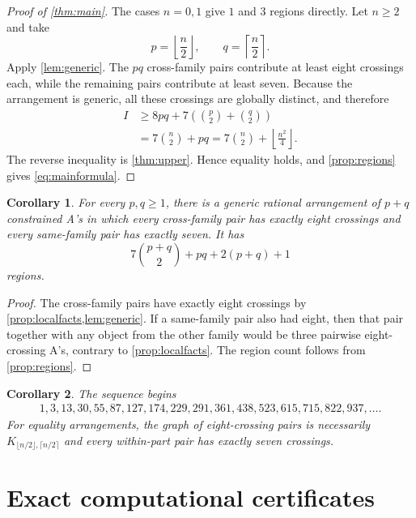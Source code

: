 \documentclass[11pt]{amsart}
\newtheorem{corollary}[corollary]{Corollary}
\theoremstyle{definition}
\begin{document}
\begin{proof}[Proof of \cref{thm:main}]
The cases $n=0,1$ give $1$ and $3$ regions directly.  Let $n\ge2$ and take
\[
 p=\left\lfloor\frac n2\right\rfloor,
 \qquad
 q=\left\lceil\frac n2\right\rceil.
\]
Apply \cref{lem:generic}.  The $pq$ cross-family pairs contribute at least
eight crossings each, while the remaining pairs contribute at least seven.
Because the arrangement is generic, all these crossings are globally
distinct, and therefore
\begin{align*}
 I
 &\ge 8pq+7\left(\binom p2+\binom q2\right)\\
 &=7\binom n2+pq
 =7\binom n2+\left\lfloor\frac{n^2}{4}\right\rfloor.
\end{align*}
The reverse inequality is \cref{thm:upper}.  Hence equality holds, and
\cref{prop:regions} gives \eqref{eq:mainformula}.
\end{proof}

\begin{corollary}\label{cor:arbitraryparts}
For every $p,q\ge1$, there is a generic rational arrangement of $p+q$
constrained A's in which every cross-family pair has exactly eight crossings
and every same-family pair has exactly seven.  It has
\[
 7\binom{p+q}{2}+pq+2(p+q)+1
\]
regions.
\end{corollary}

\begin{proof}
The cross-family pairs have exactly eight crossings by
\cref{prop:localfacts,lem:generic}.  If a same-family pair also had eight,
then that pair together with any object from the other family would be three
pairwise eight-crossing A's, contrary to \cref{prop:localfacts}.  The region
count follows from \cref{prop:regions}.
\end{proof}

\begin{corollary}
The sequence begins
\[
\begin{split}
1,3,13,30,55,87,127,174,229,291,361,438,523,615,715,822,937,\ldots.
\end{split}
\]
For equality arrangements, the graph of eight-crossing pairs is necessarily
$K_{\lfloor n/2\rfloor,\lceil n/2\rceil}$ and every within-part pair has
exactly seven crossings.
\end{corollary}

\section{Exact computational certificates}
\label{sec:certificates}
\end{document}
